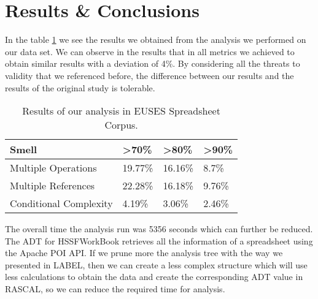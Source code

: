 \section{Results \& Conclusions}
In the table \ref{tab:ourRes} we see the results we obtained from the analysis we performed on our data set. We can observe in the results that in all metrics we achieved to obtain similar results with a deviation of 4\%.  By considering all the threats to validity that we referenced before, the difference between our results and the results of the original study is tolerable. 

\begin{table}[h]
\centering
    \begin{tabular}{llll}
    \hline
    Smell                  & >70\%  & >80\%  & >90\% \\\hline
    Multiple Operations    & 19.77\% & 16.16\% & 8.7\% \\ 
    Multiple References    & 22.28\% & 16.18\% & 9.76\% \\
    Conditional Complexity & 4.19\%  & 3.06\%  & 2.46\% \\
    \end{tabular}
    \caption{Results of our analysis in EUSES Spreadsheet Corpus.}\label{tab:ourRes}
\end{table}

The overall time the analysis run was 5356 seconds which can further be reduced. The ADT for HSSFWorkBook retrieves all the information of a spreadsheet using the Apache POI API. If we prune more the analysis tree with the way we presented in LABEL, then we can create a less complex structure which will use less calculations to obtain the data and create the corresponding ADT value in RASCAL, so we can reduce the required time for analysis.




